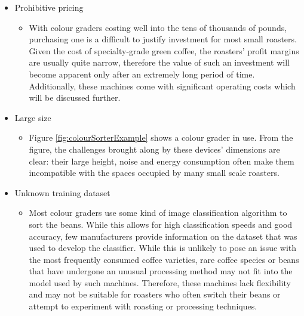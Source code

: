 \begin{itemize}
	\item Prohibitive pricing
		\begin{itemize}
			\item With colour graders costing well into the tens of thousands of pounds,
				purchasing one is a difficult to justify investment for most small
				roasters. Given the cost of specialty-grade green coffee, the roasters' profit
				margins are usually quite narrow, therefore the value of such an
				investment will become apparent only after an extremely long period of
				time. Additionally, these machines come with significant operating costs
				which will be discussed further.
		\end{itemize}

	\item Large size
		\begin{itemize}
			\item Figure \ref{fig:colourSorterExample} shows a colour grader in use.
				From the figure, the challenges brought along by these devices'
				dimensions are clear: their large height, noise and energy consumption
				often make them incompatible with the spaces occupied by many small
				scale roasters.
		\end{itemize}

	\item Unknown training dataset
		\begin{itemize}
			\item Most colour graders use some kind of image classification algorithm to
				sort the beans. While this allows for high classification speeds and
				good accuracy, few manufacturers provide information on the dataset that
				was used to develop the classifier. While this is unlikely to pose an
				issue with the most frequently consumed coffee varieties, rare coffee species
				or beans that have undergone an unusual processing method may not fit into
				the model used by such machines. Therefore, these machines lack flexibility
				and may not be suitable for roasters who often switch their beans or attempt
				to experiment with roasting or processing techniques.
		\end{itemize}


\end{itemize}
